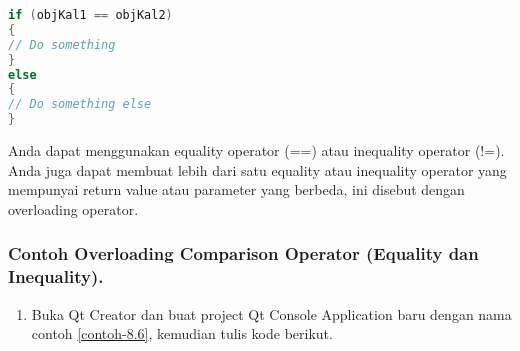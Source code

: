 \begin{lstlisting}[language=c++, numbers=none]
if (objKal1 == objKal2)
{
// Do something
}
else
{
// Do something else
}
\end{lstlisting}

Anda dapat menggunakan equality operator (==) atau inequality operator
(!=). Anda juga dapat membuat lebih dari satu equality atau inequality
operator yang mempunyai return value atau parameter yang berbeda, ini
disebut dengan overloading operator.

\subsubsection*{Contoh  Overloading Comparison Operator (Equality dan Inequality).}

\begin{enumerate}

\item
  Buka Qt Creator dan buat project Qt Console Application baru dengan
  nama contoh \ref{contoh-8.6}, kemudian tulis kode berikut.


\end{enumerate}
